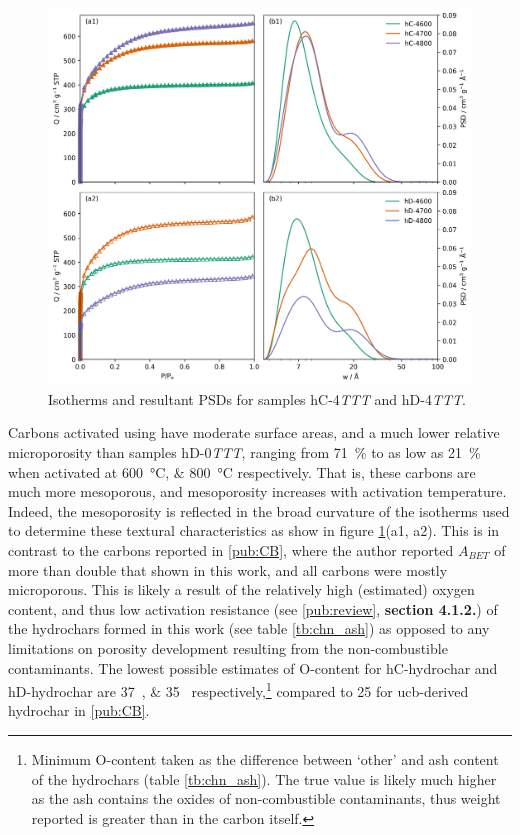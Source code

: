 \begin{figure}[t]
    \centering
    \includegraphics[width=\columnwidth, keepaspectratio]{4-cbs/figs/CB_n2_isotherms.png}
    \caption{Isotherms and resultant PSDs for samples hC-4\textit{TTT} and hD-4\textit{TTT}.}
    \label{fig:cb_isopsd}
\end{figure}

Carbons activated using  have moderate surface areas, and a much lower relative microporosity than samples hD-0\textit{TTT}, ranging from \qty{71}{\percent} to as low as \qty{21}{\percent} when activated at \qtylist[list-units=single]{600;800}{\degreeCelsius} respectively. That is, these carbons are much more mesoporous, and mesoporosity increases with activation temperature. Indeed, the mesoporosity is reflected in the broad curvature of the  isotherms used to determine these textural characteristics as show in figure \ref{fig:cb_isopsd}(a1, a2). This is in contrast to the carbons reported in \ref{pub:CB}, where the author reported $A_{BET}$ of more than double that shown in this work, and all carbons were mostly microporous. This is likely a result of the relatively high (estimated) oxygen content, and thus low activation resistance (see \ref{pub:review}, \textbf{section 4.1.2.}) of the \glspl{hydrochar} formed in this work (see table \ref{tb:chn_ash}) as opposed to any limitations on porosity development resulting from the non-combustible contaminants. The lowest possible estimates of O-content for hC-hydrochar and hD-hydrochar are \qtylist[list-units=single]{37;35}{\wtpercent} respectively,\footnote{Minimum O-content taken as the difference between `other' and \gls{ash content} of the \glspl{hydrochar} (table \ref{tb:chn_ash}). The true value is likely much higher as the ash contains the oxides of non-combustible contaminants, thus weight reported is greater than in the carbon itself.} compared to \qty{25}{\wtpercent} for \acrshort{ucb}-derived \gls{hydrochar} in \ref{pub:CB}. 


